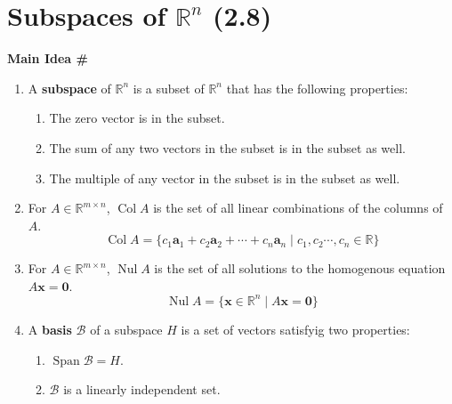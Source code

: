 \documentclass[titlepage, a4paper, 10pt]{article}
\renewcommand{\vec}[1]{\mathbf{#1}}
\DeclareMathOperator{\vspan}{Span}
\DeclareMathOperator{\colspace}{Col}
\DeclareMathOperator{\nullspace}{Nul}
\newcounter{mainideas}
\newcommand{\mainidea}{\textbf{Main Idea \#\themainideas \stepcounter{mainideas}}}
\newenvironment{mideea}[1]
{%
\begin{lrbox}{\mybox}%
	\begin{minipage}{#1\textwidth}
		{\centering \mainidea \par}

}
{\end{minipage}\end{lrbox}\begin{center}\fbox{\usebox{\mybox}}\end{center}}
\begin{document}
\section{\centering Subspaces of \(\mathbb{R}^n\) (2.8)}
\begin{mideea}{0.9}
	\begin{enumerate}
		\item A \textbf{subspace} of \(\mathbb{R}^n\) is a subset of \(\mathbb{R}^n\) that has the following properties:
			\begin{enumerate}
				\item The zero vector is in the subset.
				\item The sum of any two vectors in the subset is in the subset as well.
				\item The multiple of any vector in the subset is in the subset as well.
			\end{enumerate}
		\item For \(A \in \mathbb{R}^{m \times n}\), \(\colspace A\) is the set of all linear combinations of the columns of \(A\). 
			\[\colspace A = \{c_1\vec{a}_1 + c_2\vec{a}_2 + \cdots + c_n\vec{a}_n \mid c_1, c_2 \cdots, c_n \in \mathbb{R}\}\]
		\item For \(A \in \mathbb{R}^{m \times n}\), \(\nullspace A\) is the set of all solutions to the homogenous equation \(A \vec{x} = \vec{0}\).
			\[\nullspace A = \{\vec{x} \in \mathbb{R}^n \mid A\vec{x} = \vec{0}\}\]
		\item A \textbf{basis} \(\mathcal{B}\) of a subspace \(H\) is a set of vectors satisfyig two properties:
			\begin{enumerate}
				\item \(\vspan \mathcal{B} = H\).
				\item \(\mathcal{B}\) is a linearly independent set.
			\end{enumerate}
	\end{enumerate}
\end{mideea}
\end{document}
